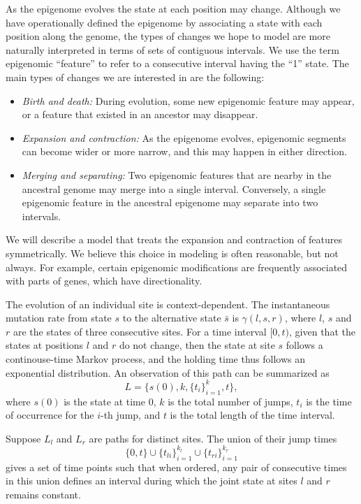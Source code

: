 \documentclass[11pt]{article}
\begin{document}
As the epigenome evolves the state at each position may
change. Although we have operationally defined the epigenome by
associating a state with each position along the genome, the types of
changes we hope to model are more naturally interpreted in terms of
sets of contiguous intervals. We use the term epigenomic ``feature''
to refer to a consecutive interval having the ``1'' state. The
main types of changes we are interested in are the following:
\begin{itemize}
\item {\it Birth and death:} During evolution, some new epigenomic
  feature may appear, or a feature that existed in an ancestor may
  disappear. %
\item {\it Expansion and contraction:} As the epigenome evolves,
  epigenomic segments can become wider or more narrow, and this may
  happen in either direction.
\item {\it Merging and separating:} Two epigenomic features that are
  nearby in the ancestral genome may merge into a single interval.
  Conversely, a single epigenomic feature in the ancestral epigenome
  may separate into two intervals.
\end{itemize}
We will describe a model that treats the expansion and contraction of
features symmetrically. We believe this choice in modeling is often
reasonable, but not always. For example, certain epigenomic
modifications are frequently associated with parts of genes, which
have directionality.

The evolution of an individual site is context-dependent. The
instantaneous mutation rate from state $s$ to the alternative state
$\bar{s}$ is $\gamma(l, s, r)$, where $l$, $s$ and $r$ are the states
of three consecutive sites.  For a time interval $[0,t)$, given that
  the states at positions $l$ and $r$ do not change, then the state at
  site $s$ follows a continouse-time Markov process, and the holding
  time thus follows an exponential distribution. An observation of
  this path can be summarized as
\[
  L = \big\{s(0), k, \{t_i\}_{i=1}^{k}, t \big\},
\]
where $s(0)$ is the state at time 0, $k$ is the total number of jumps,
$t_i$ is the time of occurrence for the $i$-th jump, and $t$ is the total
length of the time interval.

Suppose $L_l$ and $L_r$ are paths for distinct sites. The union of
their jump times
\[
  \{0, t\} \cup \{t_{li}\}_{i=1}^{k_l} \cup \{t_{ri}\}_{i=1}^{k_r}
\]
gives a set of time points such that when ordered, any pair
of consecutive times in this union defines an interval during
which the joint state at sites $l$ and $r$ remains
constant.
\end{document}
